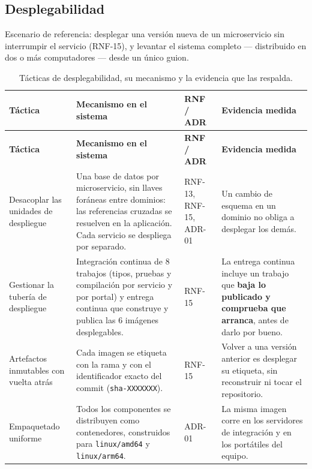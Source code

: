 \documentclass[11pt,a4paper]{article}
\begin{document}
\subsection{Desplegabilidad}

Escenario de referencia: desplegar una versión nueva de un microservicio sin interrumpir el
servicio (RNF-15), y levantar el sistema completo --- distribuido en dos o más computadores ---
desde un único guion.

\begin{center}
\begin{longtable}{|>{\raggedright\arraybackslash}p{2.9cm}|>{\raggedright\arraybackslash}p{5.1cm}|>{\raggedright\arraybackslash}p{1.7cm}|>{\raggedright\arraybackslash}p{3.7cm}|}
\caption{Tácticas de desplegabilidad, su mecanismo y la evidencia que las respalda.}\label{tab:tacticas-desplegabilidad}\\
\hline
\textbf{Táctica} & \textbf{Mecanismo en el sistema} & \textbf{RNF / ADR} & \textbf{Evidencia medida}\\
\hline
\endfirsthead
\hline
\textbf{Táctica} & \textbf{Mecanismo en el sistema} & \textbf{RNF / ADR} & \textbf{Evidencia medida}\\
\hline
\endhead

Desacoplar las unidades de despliegue &
Una base de datos por microservicio, sin llaves foráneas entre dominios: las referencias cruzadas
se resuelven en la aplicación. Cada servicio se despliega por separado. &
RNF-13, RNF-15, ADR-01 &
Un cambio de esquema en un dominio no obliga a desplegar los demás.\\
\hline

Gestionar la tubería de despliegue &
Integración continua de 8 trabajos (tipos, pruebas y compilación por servicio y por portal) y
entrega continua que construye y publica las 6 imágenes desplegables. &
RNF-15 &
La entrega continua incluye un trabajo que \textbf{baja lo publicado y comprueba que arranca},
antes de darlo por bueno.\\
\hline

Artefactos inmutables con vuelta atrás &
Cada imagen se etiqueta con la rama y con el identificador exacto del commit
(\texttt{sha-XXXXXXX}). &
RNF-15 &
Volver a una versión anterior es desplegar su etiqueta, sin reconstruir ni tocar el
repositorio.\\
\hline

Empaquetado uniforme &
Todos los componentes se distribuyen como contenedores, construidos para
\texttt{linux/amd64} y \texttt{linux/arm64}. &
ADR-01 &
La misma imagen corre en los servidores de integración y en los portátiles del equipo.\\
\hline


\end{longtable}
\end{center}
\end{document}

